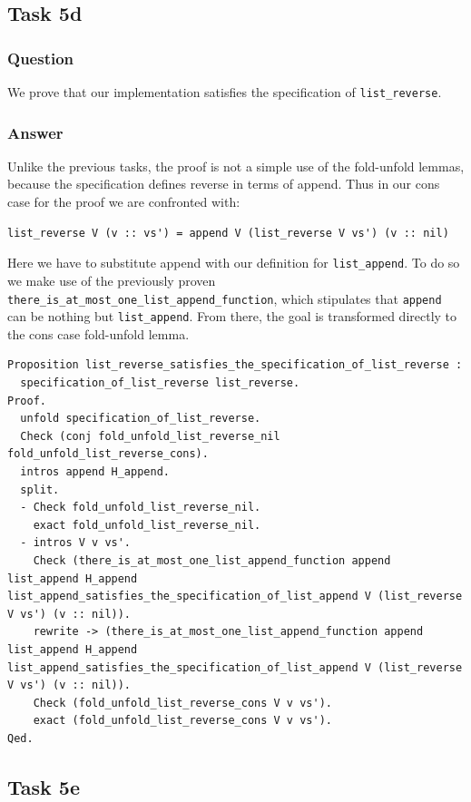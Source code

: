 \documentclass{article}
\begin{document}
\subsection{Task 5d}

\subsubsection{Question}
We prove that our implementation satisfies the specification of \texttt{list\_reverse}.

\subsubsection{Answer}
Unlike the previous tasks, the proof is not a simple use of the fold-unfold lemmas, because the specification defines reverse in terms of append. Thus in our cons case for the proof we are confronted with:

\begin{lstlisting}
list_reverse V (v :: vs') = append V (list_reverse V vs') (v :: nil)
\end{lstlisting}

Here we have to substitute append with our definition for \texttt{list\_append}. To do so we make use of the previously proven \texttt{there\_is\_at\_most\_one\_list\_append\_function}, which stipulates that \texttt{append} can be nothing but \texttt{list\_append}. From there, the goal is transformed directly to the cons case fold-unfold lemma.

\begin{lstlisting}
Proposition list_reverse_satisfies_the_specification_of_list_reverse :
  specification_of_list_reverse list_reverse.
Proof.
  unfold specification_of_list_reverse.
  Check (conj fold_unfold_list_reverse_nil fold_unfold_list_reverse_cons).
  intros append H_append.
  split.
  - Check fold_unfold_list_reverse_nil.
    exact fold_unfold_list_reverse_nil.
  - intros V v vs'.
    Check (there_is_at_most_one_list_append_function append list_append H_append list_append_satisfies_the_specification_of_list_append V (list_reverse V vs') (v :: nil)).
    rewrite -> (there_is_at_most_one_list_append_function append list_append H_append list_append_satisfies_the_specification_of_list_append V (list_reverse V vs') (v :: nil)).
    Check (fold_unfold_list_reverse_cons V v vs').
    exact (fold_unfold_list_reverse_cons V v vs').
Qed.
\end{lstlisting}

\subsection{Task 5e}
\end{document}

